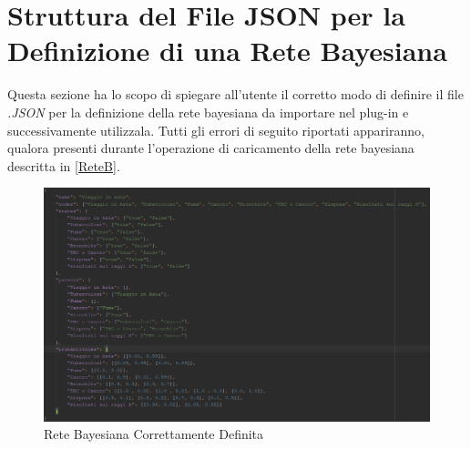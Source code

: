 \section{Struttura del File JSON per la Definizione di una Rete Bayesiana}\label{strutturaRete}

Questa sezione ha lo scopo di spiegare all'utente il corretto modo di definire il file \textit{.JSON} per la definizione della rete bayesiana da importare nel plug-in e successivamente utilizzala. Tutti gli errori di seguito riportati appariranno, qualora presenti durante l'operazione di caricamento della rete bayesiana descritta in \ref{ReteB}.


\begin{figure}[H]
	\begin{center}
		\includegraphics[scale=0.6]{./images/strutturaRete.png}
		 \caption{Rete Bayesiana Correttamente Definita}	
		 \label{ImgRete}
	\end{center}
\end{figure}

